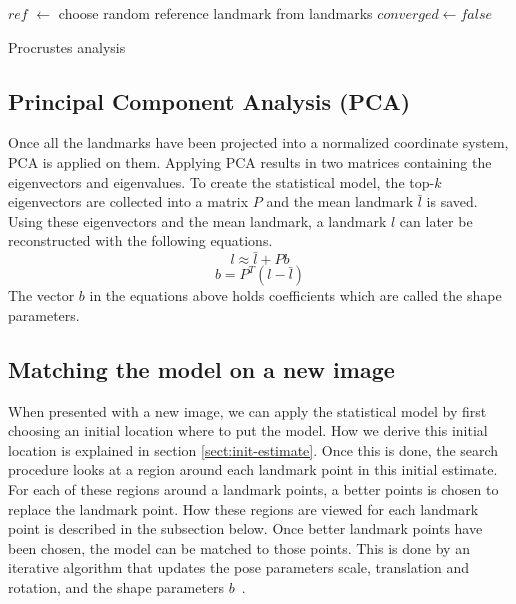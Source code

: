 \documentclass[a4paper]{article}
\begin{document}
\begin{algorithm}[!tbp]
\BlankLine

$ref$ $\leftarrow$ choose random reference landmark from landmarks\;
$converged \leftarrow false$\;
 \caption{Procrustes analysis}
 \label{algo:procr}
\end{algorithm}

\subsection{Principal Component Analysis (PCA)}
\label{subsect:pca}
Once all the landmarks have been projected into a normalized coordinate system, PCA is applied on them.
Applying PCA results in two matrices containing the eigenvectors and eigenvalues.
To create the statistical model, the top-$k$ eigenvectors are collected into a matrix $P$ and the mean landmark $\bar{l}$ is saved.
Using these eigenvectors and the mean landmark, a landmark $l$ can later be reconstructed with the following equations.
\begin{equation}
l \approx \bar{l} + Pb
\end{equation}
\begin{equation}
b = P^T (l - \bar{l})
\end{equation}
The vector $b$ in the equations above holds coefficients which are called the shape parameters.


\subsection{Matching the model on a new image}
When presented with a new image, we can apply the statistical model by first choosing an initial location where to put the model. 
How we derive this initial location is explained in section \ref{sect:init-estimate}.
Once this is done, the search procedure looks at a region around each landmark point in this initial estimate.
For each of these regions around a landmark points, a better points is chosen to replace the landmark point.
How these regions are viewed for each landmark point is described in the subsection below.
Once better landmark points have been chosen, the model can be matched to those points.
This is done by an iterative algorithm that updates the pose parameters scale, translation and rotation, and the shape parameters $b$~\cite{Cootes1992AnIT}.
\end{document}
